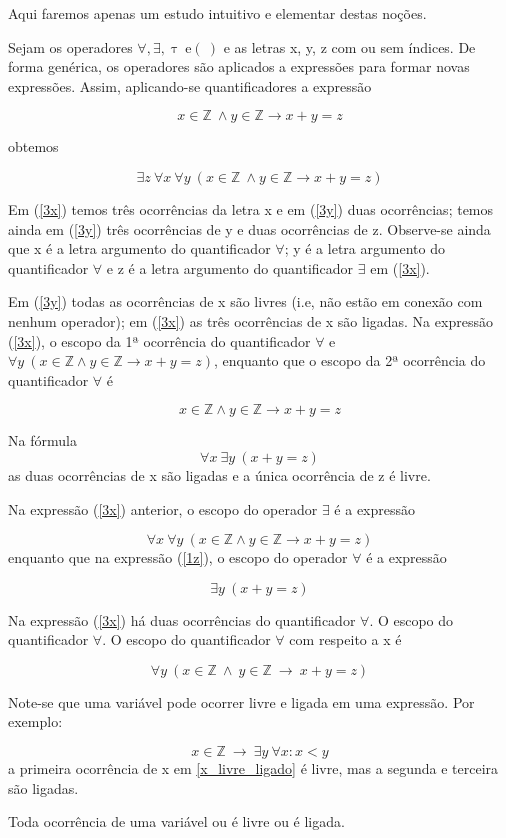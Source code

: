 Aqui faremos apenas um  estudo intuitivo e  elementar destas noções.

Sejam os operadores $\forall, \exists, \uptau\ \text{e} (\ )$ e as letras x, y, z com ou sem índices.
De forma genérica, os operadores são aplicados a expressões para formar novas expressões.
Assim, aplicando-se quantificadores a expressão

\begin{equation}\label{3y}
    x \in \mathbb{Z}\ \land y \in \mathbb{Z} \to x + y = z \tag{1}
\end{equation}

obtemos

\begin{equation}\label{3x}
    \exists z\ \forall x\ \forall y\ (x \in \mathbb{Z}\ \land y \in \mathbb{Z} \to x + y = z) \tag{2}
\end{equation}

Em (\ref{3x}) temos três ocorrências da letra x e em (\ref{3y}) duas ocorrências; temos ainda em (\ref{3y}) três ocorrências de y e duas ocorrências de z.
Observe-se ainda que x é a letra argumento do quantificador $\forall$; y é a letra argumento do quantificador $\forall$ e z é a letra argumento do quantificador $\exists$ em (\ref{3x}).

Em (\ref{3y}) todas as ocorrências de x são livres (i.e, não estão em  conexão com nenhum operador); em (\ref{3x}) as três ocorrências de x são ligadas.
Na expressão (\ref{3x}), o escopo da 1ª ocorrência do quantificador $\forall$ e $\forall y\ (x \in \mathbb{Z} \land y \in \mathbb{Z} \to x + y = z)$, enquanto que o escopo da 2ª ocorrência do quantificador $\forall$ é

$$x \in \mathbb{Z} \land y \in \mathbb{Z} \to x + y = z$$

Na fórmula
\begin{equation}\label{1z}
    \forall x\ \exists y\ (x + y = z) \tag{3}
\end{equation}
as duas ocorrências de x são ligadas e a única ocorrência de z é livre.

Na expressão (\ref{3x}) anterior, o escopo do operador $\exists$ é a expressão

$$\forall x\ \forall y\ (x \in \mathbb{Z} \land y \in \mathbb{Z} \to x + y = z)$$
enquanto que na expressão (\ref{1z}), o escopo do operador $\forall$ é a expressão

$$\exists y\ (x + y = z)$$

Na expressão (\ref{3x}) há duas ocorrências do quantificador $\forall$.
O escopo do quantificador $\forall$.
O escopo do quantificador $\forall$ com respeito a x é

$$\forall y\ (x \in \mathbb{Z}\ \land\ y \in \mathbb{Z}\ \to\ x + y = z)$$

Note-se que uma variável pode ocorrer livre e ligada em uma expressão.
Por exemplo:

\begin{equation}\label{x_livre_ligado}
    x \in \mathbb{Z}\ \to\ \exists y\ \forall x \colon x < y \tag{4}
\end{equation}
a primeira ocorrência de x em \ref{x_livre_ligado} é livre, mas a segunda e terceira são ligadas.

Toda ocorrência de uma variável ou é livre ou é ligada.
